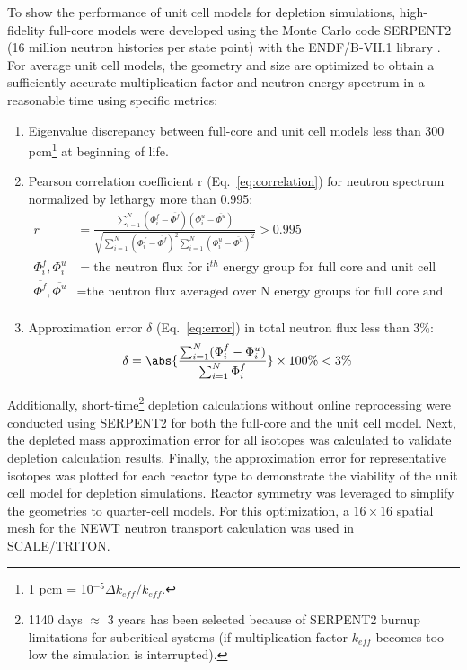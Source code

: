 \documentclass[letterpaper]{mandc2019}
\begin{document}
To show the performance of unit cell models for depletion simulations, high-fidelity full-core models were developed using the Monte Carlo code SERPENT2 (16 million neutron histories per state point) with the ENDF/B-VII.1 library \cite{leppanen_serpent_2015, chadwick_endf/b-vii.1_2011}. 
For average unit cell models, the geometry and size are optimized to obtain a sufficiently accurate multiplication factor and neutron energy spectrum in a reasonable time using specific metrics:
\begin{enumerate}
	\item Eigenvalue discrepancy between full-core and unit cell models less than 300 pcm\footnote{ 1 pcm = 10$^{-5}\Delta k_{eff}/k_{eff}$.} at beginning of life.\vspace{-0.1in}
	\item Pearson correlation coefficient r (Eq.~\ref{eq:correlation}) for neutron spectrum normalized by lethargy more than 0.995:
\begin{align}
r &= \frac{\sum_{i=1}^{N} (\Phi_i^f-\overline{\Phi^f})(\Phi_i^u-\overline{\Phi^u})}
		  {\sqrt{\sum_{i=1}^{N} (\Phi_i^f-\overline{\Phi^f})^2 \sum_{i=1}^{N} (\Phi_i^u-\overline{\Phi^u})^2}} > 0.995 \label{eq:correlation} \\
\Phi_i^f,\Phi_i^u &= \mbox{the neutron flux for i$^{th}$ energy group for full core and unit cell} \nonumber\\
\overline{\Phi^f}, \overline{\Phi^u} &= \mbox{the neutron flux averaged over N energy groups for full core and unit cell} \nonumber \\
\end{align}		\vspace{-0.3in}
	\item Approximation error $\delta$ (Eq.~\ref{eq:error})  in total neutron flux less than 3\%:
\begin{align}
\delta &= \abs{\frac{\sum_{i=1}^{N} (\Phi_i^f-\Phi_i^u)}
{\sum_{i=1}^{N} \Phi_i^f}} \times 100\% < 3\% \label{eq:error}
\end{align}	
	\vspace{-0.4in}
\end{enumerate}

Additionally, short-time\footnote{1140 days $\approx$ 3 years has been selected because of SERPENT2 burnup limitations for subcritical systems (if multiplication factor $k_{eff}$ becomes too low the simulation is interrupted).} depletion calculations without online reprocessing were conducted using SERPENT2 for both the full-core and the unit cell model. 
Next, the depleted mass approximation error for all isotopes was calculated to validate depletion calculation results. 
Finally, the approximation error for representative isotopes was plotted for each reactor type to demonstrate the viability of the unit cell model for depletion simulations. 
Reactor symmetry was leveraged to simplify the geometries to quarter-cell models. 
For this optimization, a $16\times 16$ spatial mesh for the NEWT neutron transport calculation was used in SCALE/TRITON.
\end{document}
